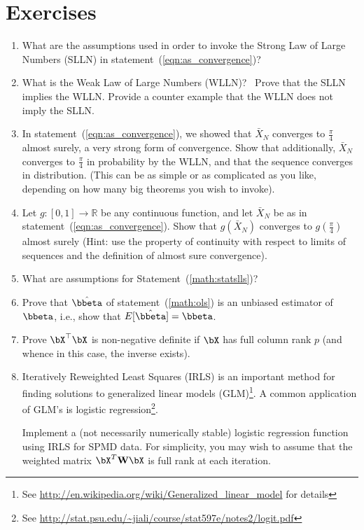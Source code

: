 \section{Exercises}
\label{sec:statistics_exercise}

\begin{enumerate}[label=\thechapter-\arabic*]
\item
What are the assumptions used in order to invoke the Strong Law of Large 
Numbers (SLLN) in statement~(\ref{eqn:as_convergence})?

\item
What is the Weak Law of Large Numbers (WLLN)?~
Prove that the SLLN implies the WLLN. Provide a counter example that the WLLN 
does not imply the SLLN.

\item
In statement~(\ref{eqn:as_convergence}), we showed that $\bar{X}_N$ converges 
to $\frac{\pi}{4}$ almost surely, a very strong form of convergence.  Show that 
additionally, $\bar{X}_N$ converges to $\frac{\pi}{4}$ in probability by the 
WLLN, and that the sequence converges in distribution.  (This can be as simple 
or as complicated as you like, depending on how many big theorems you wish to 
invoke).

\item
Let $g : [0, 1] \rightarrow  \mathbb{R}$ be any continuous function, and let 
$\bar{X}_N$ be as in statement~(\ref{eqn:as_convergence}).  Show that 
$g(\bar{X}_N)$ converges to $g\left(\frac{\pi}{4}\right)$ almost surely (Hint: 
use the property of continuity with respect to limits of sequences and the 
definition of almost sure convergence).

\item
What are assumptions for Statement~(\ref{math:statslls})?

\item
Prove that $\hat{\bbeta}$ of statement~(\ref{math:ols}) is an unbiased
estimator of $\bbeta$, i.e., show that $E[ \hat{\bbeta}] = \bbeta$.

\item
Prove $\bX^\top\bX$ is non-negative definite if $\bX$ has full column rank 
$p$ (and whence in this case, the inverse exists).

\item
Iteratively Reweighted Least Squares (IRLS) is an important method for finding 
solutions to generalized linear models (GLM)\footnote{See 
\url{http://en.wikipedia.org/wiki/Generalized_linear_model} for details}.  A 
common application of GLM's is logistic regression\footnote{See 
\url{http://stat.psu.edu/~jiali/course/stat597e/notes2/logit.pdf}}.

Implement a (not necessarily numerically stable) logistic regression function 
using IRLS for SPMD data.  For simplicity, you may wish to assume that the 
weighted matrix $\bX^T\textbf{W}\bX$ is full rank at each iteration.
  
\end{enumerate}

